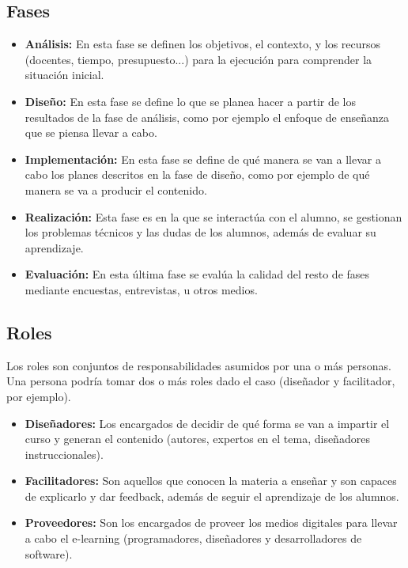 \subsection{Fases}
\begin{itemize}
	\item \textbf{Análisis:}
	En esta fase se definen los objetivos, el contexto, y los recursos (docentes, tiempo, presupuesto...) para la ejecución para comprender la situación inicial.
	\item \textbf{Diseño:}
	En esta fase se define lo que se planea hacer a partir de los resultados de la fase de análisis, como por ejemplo el enfoque de enseñanza que se piensa llevar a cabo.
	\item \textbf{Implementación:}
	En esta fase se define de qué manera se van a llevar a cabo los planes descritos en la fase de diseño, como por ejemplo de qué manera se va a producir el contenido.
	\item \textbf{Realización:}
	Esta fase es en la que se interactúa con el alumno, se gestionan los problemas técnicos y las dudas de los alumnos, además de evaluar su aprendizaje.
	\item \textbf{Evaluación:}
	En esta última fase se evalúa la calidad del resto de fases mediante encuestas, entrevistas, u otros medios.
\end{itemize}



\subsection{Roles}
Los roles son conjuntos de responsabilidades asumidos por una o más personas. Una persona podría tomar dos o más roles dado el caso (diseñador y facilitador, por ejemplo).
\begin{itemize}
	\item \textbf{Diseñadores:}
	Los encargados de decidir de qué forma se van a impartir el curso y generan el contenido (autores, expertos en el tema, diseñadores instruccionales).
	\item \textbf{Facilitadores:}
	Son aquellos que conocen la materia a enseñar y son capaces de explicarlo y dar feedback, además de seguir el aprendizaje de los alumnos.
	\item \textbf{Proveedores:}
	Son los encargados de proveer los medios digitales para llevar a cabo el e-learning (programadores, diseñadores y desarrolladores de software).
\end{itemize}


